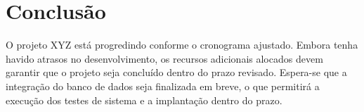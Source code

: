 \documentclass[12pt]{article}
\begin{document}
\section*{Conclusão}
O projeto XYZ está progredindo conforme o cronograma ajustado. Embora tenha havido atrasos no desenvolvimento, os recursos adicionais alocados devem garantir que o projeto seja concluído dentro do prazo revisado. Espera-se que a integração do banco de dados seja finalizada em breve, o que permitirá a execução dos testes de sistema e a implantação dentro do prazo.
\end{document}
